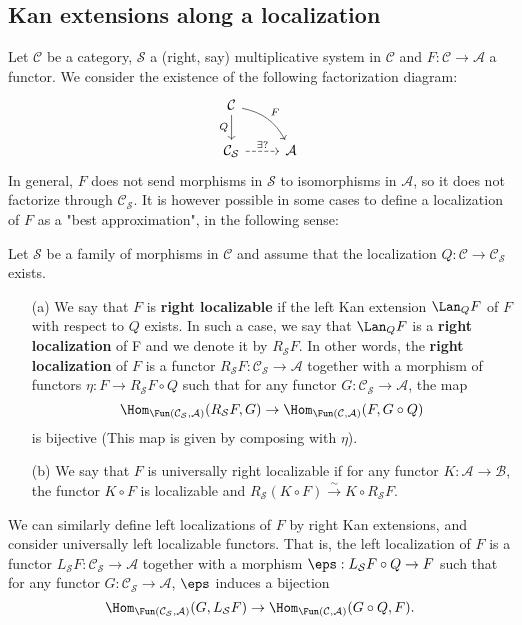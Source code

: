 \subsection{Kan extensions along a localization}
Let $\mathcal{C}$ be a category, $\mathcal{S}$ a (right, say) multiplicative system in $\mathcal{C}$ and $F:\mathcal{C}\to\mathcal{A}$ a functor. We consider the existence of the following factorization diagram:
\[\begin{tikzcd}
\mathcal{C}\ar[rd,bend left=25pt,"F"]\ar[d,swap,"Q"]&\\
\mathcal{C}_\mathcal{S}\ar[r,dashed,"\exists ?"]&\mathcal{A}
\end{tikzcd}\]
In general, $F$ does not send morphisms in $\mathcal{S}$ to isomorphisms in $\mathcal{A}$, so it does not factorize through $\mathcal{C}_\mathcal{S}$. It is however possible in some cases to define a localization of $F$ as a "best approximation", in the following sense:
\begin{definition}
Let $\mathcal{S}$ be a family of morphisms in $\mathcal{C}$ and assume that the localization $Q:\mathcal{C}\to\mathcal{C}_\mathcal{S}$ exists.
\begin{enumerate}
    \item[(a)] We say that $F$ is \textbf{right localizable} if the left Kan extension $\Lan_QF$ of $F$ with respect to $Q$ exists. In such a case, we say that $\Lan_QF$ is a \textbf{right localization} of F and we denote it by $R_\mathcal{S}F$. In other words, the \textbf{right localization} of $F$ is a functor $R_\mathcal{S}F:\mathcal{C}_\mathcal{S}\to\mathcal{A}$ together with a morphism of functors $\eta:F\to R_\mathcal{S}F\circ Q$ such that for any functor $G:\mathcal{C}_\mathcal{S}\to\mathcal{A}$, the map
    \[\Hom_{\Fun(\mathcal{C}_\mathcal{S},\mathcal{A})}(R_\mathcal{S}F,G)\to\Hom_{\Fun(\mathcal{C},\mathcal{A})}(F,G\circ Q)\]
    is bijective (This map is given by composing with $\eta$). 
    \item[(b)] We say that $F$ is universally right localizable if for any functor $K:\mathcal{A}\to\mathcal{B}$, the functor $K\circ F$ is localizable and $R_\mathcal{S}(K\circ F)\stackrel{\sim}{\to} K\circ R_\mathcal{S}F$.
\end{enumerate}
\end{definition}
We can similarly define left localizations of $F$ by right Kan extensions, and consider universally left localizable functors. That is, the left localization of $F$ is a functor $L_\mathcal{S}F:\mathcal{C}_\mathcal{S}\to\mathcal{A}$ together with a morphism $\eps:L_\mathcal{S}F\circ Q\to F$ such that for any functor $G:\mathcal{C}_\mathcal{S}\to\mathcal{A}$, $\eps$ induces a bijection
\[\Hom_{\Fun(\mathcal{C}_\mathcal{S},\mathcal{A})}(G,L_\mathcal{S}F)\to\Hom_{\Fun(\mathcal{C},\mathcal{A})}(G\circ Q,F).\]

